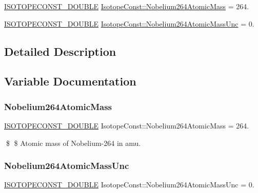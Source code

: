 \begin{DoxyCompactItemize}
\item 
\mbox{\hyperlink{group___isotope_const-_macros_ga8f45a7272ce02c0b4c65c44636ed719a}{I\+S\+O\+T\+O\+P\+E\+C\+O\+N\+S\+T\+\_\+\+D\+O\+U\+B\+LE}} \mbox{\hyperlink{group___isotope_const-_nobelium-_no264_ga707d02497243f92c7eff26a4d3f122e5}{Isotope\+Const\+::\+Nobelium264\+Atomic\+Mass}} = 264.
\item 
\mbox{\hyperlink{group___isotope_const-_macros_ga8f45a7272ce02c0b4c65c44636ed719a}{I\+S\+O\+T\+O\+P\+E\+C\+O\+N\+S\+T\+\_\+\+D\+O\+U\+B\+LE}} \mbox{\hyperlink{group___isotope_const-_nobelium-_no264_gad9a537703d900260ffb92dca39ae251c}{Isotope\+Const\+::\+Nobelium264\+Atomic\+Mass\+Unc}} = 0.
\end{DoxyCompactItemize}


\subsection{Detailed Description}


\subsection{Variable Documentation}
\mbox{\label{group___isotope_const-_nobelium-_no264_ga707d02497243f92c7eff26a4d3f122e5}} 
\subsubsection{\texorpdfstring{Nobelium264\+Atomic\+Mass}{Nobelium264AtomicMass}}
{\footnotesize\ttfamily \mbox{\hyperlink{group___isotope_const-_macros_ga8f45a7272ce02c0b4c65c44636ed719a}{I\+S\+O\+T\+O\+P\+E\+C\+O\+N\+S\+T\+\_\+\+D\+O\+U\+B\+LE}} Isotope\+Const\+::\+Nobelium264\+Atomic\+Mass = 264.}

\$ \$ Atomic mass of Nobelium-\/264 in amu. \mbox{\label{group___isotope_const-_nobelium-_no264_gad9a537703d900260ffb92dca39ae251c}} 
\subsubsection{\texorpdfstring{Nobelium264\+Atomic\+Mass\+Unc}{Nobelium264AtomicMassUnc}}
{\footnotesize\ttfamily \mbox{\hyperlink{group___isotope_const-_macros_ga8f45a7272ce02c0b4c65c44636ed719a}{I\+S\+O\+T\+O\+P\+E\+C\+O\+N\+S\+T\+\_\+\+D\+O\+U\+B\+LE}} Isotope\+Const\+::\+Nobelium264\+Atomic\+Mass\+Unc = 0.}

